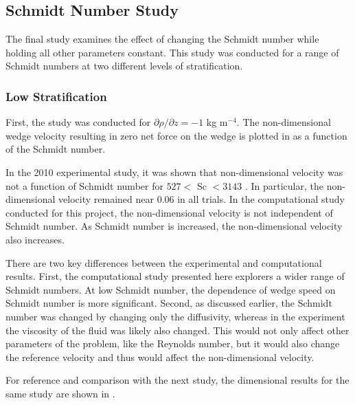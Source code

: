 \documentclass[12pt]{article}
\begin{document}
\subsection{Schmidt Number Study}

The final study examines the effect of changing the Schmidt number while holding all other parameters constant. This study was conducted for a range of Schmidt numbers at two different levels of stratification.

\subsubsection{Low Stratification}

First, the study was conducted for $\partial\rho/\partial z=-1$ kg m$^{-4}$. The non-dimensional wedge velocity resulting in zero net force on the wedge is plotted in  as a function of the Schmidt number.


In the 2010 experimental study, it was shown that non-dimensional velocity was not a function of Schmidt number for $527<$ Sc $<3143$ \cite{allshouse2010propulsion}. In particular, the non-dimensional velocity remained near 0.06 in all trials. In the computational study conducted for this project, the non-dimensional velocity is not independent of Schmidt number. As Schmidt number is increased, the non-dimensional velocity also increases.

There are two key differences between the experimental and computational results. First, the computational study presented here explorers a wider range of Schmidt numbers. At low Schmidt number, the dependence of wedge speed on Schmidt number is more significant. Second, as discussed earlier, the Schmidt number was changed by changing only the diffusivity, whereas in the experiment the viscosity of the fluid was likely also changed. This would not only affect other parameters of the problem, like the Reynolds number, but it would also change the reference velocity and thus would affect the non-dimensional velocity.

For reference and comparison with the next study, the dimensional results for the same study are shown in .

\end{document}
